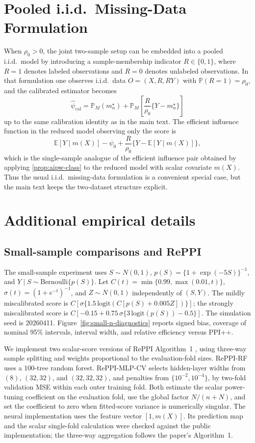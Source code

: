 \documentclass{article}
\theoremstyle{plain}
\theoremstyle{definition}
\newcommand{\E}{\mathbb{E}}
\newcommand{\Prob}{\mathbb{P}}
\newcommand{\1}{\mathbbm{1}}
\newcommand{\psihat}{\widehat{\psi}_{\mathrm{cal}}}
\newcommand{\mhat}{m}
\newcommand{\rhozero}{\rho_0}
\newcommand{\mtilde}{m_n^\star}
\begin{document}
\section{Pooled i.i.d.\ Missing-Data Formulation}
\label{app:iid}

When \(\rhozero>0\), the joint two-sample setup can be embedded into a pooled i.i.d.\ model by introducing a sample-membership indicator \(R \in \{0,1\}\), where \(R=1\) denotes labeled observations and \(R=0\) denotes unlabeled observations. In that formulation one observes i.i.d.\ data \(O=(X,R,RY)\) with \(\Prob(R=1)=\rhozero\), and the calibrated estimator becomes
\[
\psihat = \mathbb P_M(\mtilde) + \mathbb P_M\left[\frac{R}{\rhozero}\{Y-\mtilde\}\right]
\]
up to the same calibration identity as in the main text. The efficient influence function in the reduced model observing only the score is
\[
\E[Y\mid m(X)]-\psi_0
+\frac{R}{\rhozero}\{Y-\E[Y\mid m(X)]\},
\]
which is the single-sample analogue of the efficient influence pair obtained by applying \cref{prop:aipw-class} to the reduced model with scalar covariate \(\mhat(X)\). Thus the usual i.i.d.\ missing-data formulation is a convenient special case, but the main text keeps the two-dataset structure explicit.

 \section{Additional empirical details}
\label{app:empirical}

\subsection{Small-sample comparisons and RePPI}
\label{app:small-n}

The small-sample experiment uses \(S\sim N(0,1)\),
\(p(S)=\{1+\exp(-5S)\}^{-1}\), and \(Y\mid S\sim\mathrm{Bernoulli}\{p(S)\}\).
Let \(C(t)=\min\{0.99,\max(0.01,t)\}\), \(\sigma(t)=(1+e^{-t})^{-1}\),
and \(Z\sim N(0,1)\) independently of \((S,Y)\).
The mildly miscalibrated score is
\(C[\sigma\{1.5\,\mathrm{logit}(C[p(S)+0.005Z])\}]\);
the strongly miscalibrated score is
\(C[-0.15+0.75\,\sigma\{3\,\mathrm{logit}(p(S))-0.5\}]\).
The simulation seed is 20260411. Figure~\ref{fig:small-n-diagnostics} reports
signed bias, coverage of nominal 95\% intervals, interval width, and relative
efficiency versus PPI++.

We implement two scalar-score versions of RePPI Algorithm~1
\citep{ji2025predictions}, using three-way sample splitting and
weights proportional to the evaluation-fold sizes. RePPI-RF uses a 100-tree random forest.
RePPI-MLP-CV selects hidden-layer widths from \((8)\), \((32,32)\), and
\((32,32,32)\), and penalties from \(\{10^{-2},10^{-4}\}\), by two-fold
validation MSE within each outer training fold. Both estimate the scalar
power-tuning coefficient on the evaluation fold, use the global factor
\(N/(n+N)\), and set the coefficient to zero when fitted-score variance is
numerically singular. The neural implementation uses the feature vector
\([1,m(X)]\). Its prediction map and the scalar single-fold calculation were
checked against the public implementation; the three-way aggregation follows
the paper's Algorithm~1.
\end{document}
